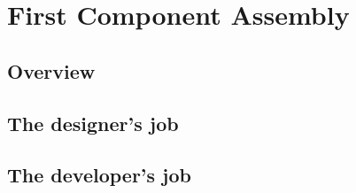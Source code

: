 \chapter{First Component Assembly}
\begin{flushright}
{\it }
\end{flushright}

\section{Overview}



\section{The designer's job}

\section{The developer's job}
